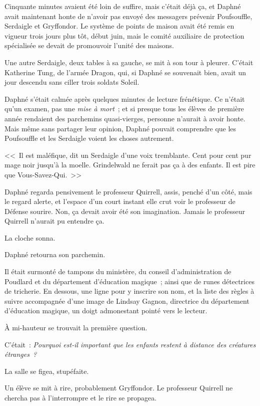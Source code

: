 Cinquante minutes avaient été loin de suffire, mais c'était déjà ça, et Daphné avait maintenant honte de n'avoir pas envoyé des messagers prévenir Poufsouffle, Serdaigle et Gryffondor. Le système de points de maison avait été remis en vigueur trois jours plus tôt, début juin, mais le comité auxiliaire de protection spécialisée se devait de promouvoir l'unité des maisons.

Une autre Serdaigle, deux tables à sa gauche, se mit à son tour à pleurer. C'était Katherine Tung, de l'armée Dragon, qui, si Daphné se souvenait bien, avait un jour descendu sans ciller trois soldats Soleil.

Daphné s'était calmée après quelques minutes de lecture frénétique. Ce n'était qu'un examen, pas une \emph{mise à mort}~; et si presque tous les élèves de première année rendaient des parchemins quasi-vierges, personne n'aurait à avoir honte. Mais même sans partager leur opinion, Daphné pouvait comprendre que les Poufsouffle et les Serdaigle voient les choses autrement.

<<~Il est maléfique, dit un Serdaigle d'une voix tremblante. Cent pour cent pur mage noir jusqu'à la moelle. Grindelwald ne ferait pas ça à des enfants. Il est pire que Vous-Savez-Qui.~>>

Daphné regarda pensivement le professeur Quirrell, assis, penché d'un côté, mais le regard alerte, et l'espace d'un court instant elle crut voir le professeur de Défense sourire. Non, ça devait avoir été son imagination. Jamais le professeur Quirrell n'aurait pu entendre ça.

La cloche sonna.

Daphné retourna son parchemin.

Il était surmonté de tampons du ministère, du conseil d'administration de Poudlard et du département d'éducation magique~; ainsi que de runes détectrices de tricherie. En dessous, une ligne pour y inscrire son nom, et la liste des règles à suivre accompagnée d'une image de Lindsay Gagnon, directrice du département d'éducation magique, un doigt admonestant pointé vers le lecteur.

À mi-hauteur se trouvait la première question.

C'était~: \emph{Pourquoi est-il important que les enfants restent à distance des créatures étranges~?}

La salle se figea, stupéfaite.

Un élève se mit à rire, probablement Gryffondor. Le professeur Quirrell ne chercha pas à l'interrompre et le rire se propagea.

